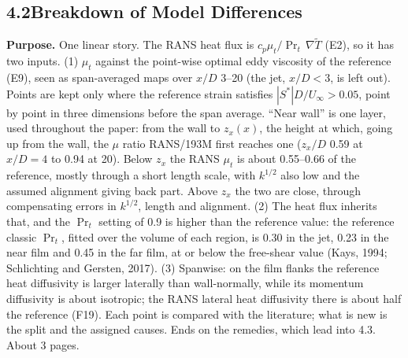 \documentclass[10pt]{article}
\begin{document}
\subsection*{4.2\quad Breakdown of Model Differences}
\textbf{Purpose.} One linear story. The RANS heat flux is $c_p\mu_t/\Pr_t\,\nabla\tilde T$
(E2), so it has two inputs. (1) $\mu_t$ against the point-wise optimal eddy viscosity of the reference (E9), seen
as span-averaged maps over $x/D$ 3--20 (the jet, $x/D<3$, is left out). Points are kept only where the
reference strain satisfies $|S^*|D/U_\infty>0.05$, point by point in three dimensions before the span average.
``Near wall'' is one layer, used throughout the paper: from the wall to $z_x(x)$, the height at which, going up
from the wall, the $\mu$ ratio RANS/193M first reaches one ($z_x/D$ 0.59 at $x/D=4$ to 0.94 at 20). Below
$z_x$ the RANS $\mu_t$ is about 0.55--0.66 of the reference, mostly through a short length scale, with $k^{1/2}$
also low and the assumed alignment giving back part. Above $z_x$ the two are close, through compensating errors
in $k^{1/2}$, length and alignment. (2) The heat flux inherits that, and the
$\Pr_t$ setting of 0.9 is higher than the reference value: the reference classic $\Pr_t$, fitted over the volume of each region, is 0.30 in the jet, 0.23 in the near film and 0.45 in the far film, at or below the free-shear value
(Kays, 1994; Schlichting and Gersten, 2017). (3) Spanwise: on the film flanks the reference heat diffusivity is larger
laterally than wall-normally, while its momentum diffusivity is about isotropic; the RANS lateral heat
diffusivity there is about half the reference (F19). Each point is compared with the literature; what is new is the
split and the assigned causes. Ends on the remedies, which lead into 4.3. About 3 pages.
\end{document}
